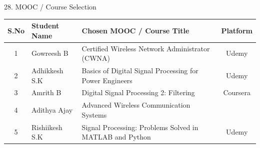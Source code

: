 \documentclass[aspectratio=169,11pt]{beamer}
\begin{document}

\begin{frame}{28. MOOC / Course Selection}

\centering
\small

\renewcommand{\arraystretch}{1.35}
\setlength{\tabcolsep}{7pt}

\begin{tabular}{|c|l|p{7.5cm}|c|}
\hline
\rowcolor{red!70!black}
\color{white}\textbf{S.No} &
\color{white}\textbf{Student Name} &
\color{white}\textbf{Chosen MOOC / Course Title} &
\color{white}\textbf{Platform} \\
\hline

1 & Gowreesh B &
Certified Wireless Network Administrator (CWNA) &
Udemy \\ \hline

\rowcolor{gray!10}
2 & Adhikkesh S.K &
Basics of Digital Signal Processing for Power Engineers &
Udemy \\ \hline

3 & Amrith B &
Digital Signal Processing 2: Filtering &
Coursera \\ \hline

\rowcolor{gray!10}
4 & Adithya Ajay &
Advanced Wireless Communication Systems \\ \hline

5 & Rishiikesh S.K &
Signal Processing: Problems Solved in MATLAB and Python &
Udemy \\ \hline

\end{tabular}


\end{frame}



\end{document}
